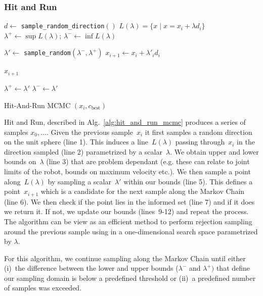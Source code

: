 \documentclass[letterpaper, 10 pt, conference]{ieeeconf}  %
\begin{document}
\subsubsection{Hit and Run}
\begin{algorithm}[t]
	\begin{algorithmic}[1]
		\STATE $d \leftarrow$ \texttt{sample\_random\_direction}$()$
		\STATE $ L(\lambda) = \{  x \mid x = x_i + \lambda d_i \} $
		\STATE $ \lambda^{+} \leftarrow \sup L(\lambda) $; 
				\hspace{3mm} 
			   $ \lambda^{-} \leftarrow \inf L(\lambda) $
			   
		\LOOP


		\STATE $ \lambda' \leftarrow$ \texttt{sample\_random}$ (\lambda^{-} , \lambda^{+})$
		\STATE $ x_{i+1} \leftarrow x_{i} + \lambda'_{i} d_i $
		
		  \RETURN $ x_{i+1}$
		\ENDIF


			\STATE $ \lambda^{+} \leftarrow \lambda' $
		\ELSE
			\STATE $ \lambda^{-} \leftarrow \lambda'$
		\ENDIF
		
		\ENDLOOP
  	\end{algorithmic}
	\caption{Hit-And-Run MCMC $(x_{i}, c_{\text{best}})$}
	\label{alg:hit_and_run_mcmc}	
\end{algorithm}


Hit and Run, described in Alg.~\ref{alg:hit_and_run_mcmc} produces a series of samples $x_0, \ldots$.
Given the previous sample~$x_i$ it first  samples a random direction on the unit sphere (line 1).
This induces a line~$L(\lambda)$ passing through~$x_i$  in the direction sampled (line 2) parametrized by a scalar~$\lambda$.
We obtain upper and lower bounds on~$\lambda$ (line 3) that are problem dependant (e.g. these can relate to joint limits of the robot, bounds on maximum velocity etc.).
We then sample a point along~$L(\lambda)$ by sampling a scalar~$\lambda'$ within our bounds (line 5).
This defines a point~$x_{i+1}$ which is a candidate for the next sample along the Markov Chain (line 6).
We then check if the point lies in the informed set (line 7) and if it does we return it.
If not, we update our bounds (lines~9-12) and repeat the process.
The algorithm can be view as an efficient method to perform rejection sampling around the previous sample using in a one-dimensional search space parametrized by $\lambda$.

For this algorithm, we continue sampling along the Markov Chain until either 
(i)~the difference between the lower and upper bounds ($\lambda^-$ and $\lambda^+)$ 
that define our sampling domain is below a predefined threshold or
(ii)~a predefined number of samples was exceeded.
\end{document}
